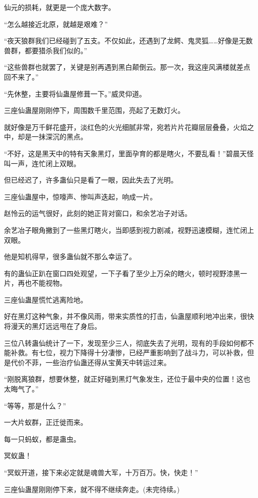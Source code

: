 \begin{this_body}
仙元的损耗，就更是一个庞大数字。

“怎么越接近北原，就越是艰难？”

“夜天狼群我们已经碰到了五支。不仅如此，还遇到了龙鳄、鬼灵狐……好像是无数兽群，都要猎杀我们似的。”

“这些兽群也就罢了，关键是别再遇到黑白颠倒云。那一次，我这座风满楼就差点回不来了。”

“先休整，主要将仙蛊屋修葺一下。”威灵仰道。

三座仙蛊屋刚刚停下，周围数千里范围，亮起了无数灯火。

就好像是万千鲜花盛开，淡红色的火光细腻非常，宛若片片花瓣层层叠叠，火焰之中，却是一抹深沉的黑点。

“不好，这是黑天中的特有天象黑灯，里面孕育的都是瞎火，不要乱看！”碧晨天怪叫一声，连忙闭上双眼。

但已经迟了，许多蛊仙只是看了一眼，因此失去了光明。

三座仙蛊屋中，惊嚎声、惨叫声迭起，响成一片。

赵怜云的运气很好，此刻的她正背对窗口，和余艺冶子对话。

余艺冶子眼角撇到了一些黑灯瞎火，当即感到视力剧减，视野迅速模糊，连忙闭上双眼。

他是知机得早，很多蛊仙就不那么幸运了。

有的蛊仙正趴在窗口四处观望，一下子看了至少上万朵的瞎火，顿时视野漆黑一片，再也不能视物。

三座仙蛊屋慌忙逃离险地。

好在黑灯这种气象，并不像风雨，带来实质性的打击，仙蛊屋顺利地冲出来，很快将漫天的黑灯远远甩在了身后。

三位八转蛊仙统计了一下，发现至少三人，彻底失去了光明，现有的手段如何都不能补救。有七位，视力下降得十分凄惨，已经严重影响到了战斗力，可以补救，但是代价不菲，一些治疗仙蛊还得从宝黄天中转运过来。

“刚脱离狼群，想要休整，就正好碰到黑灯气象发生，还位于最中央的位置！这也太晦气了。”

“等等，那是什么？”

一大片蚁群，正迁徙而来。

每一只蚂蚁，都是蛊虫。

冥蚁蛊！

“冥蚁开道，接下来必定就是魂兽大军，十万百万。快，快走！”

三座仙蛊屋刚刚停下来，就不得不继续奔走。(未完待续。)

\end{this_body}


